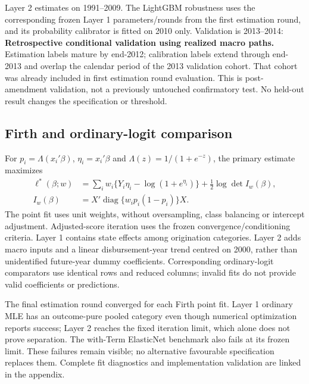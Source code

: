 Layer 2 estimates on 1991--2009. The LightGBM robustness uses the corresponding frozen Layer 1 parameters/rounds from the first estimation round, and its probability calibrator is fitted on 2010 only. Validation is 2013--2014: \textbf{Retrospective conditional validation using realized macro paths.} Estimation labels mature by end-2012; calibration labels extend through end-2013 and overlap the calendar period of the 2013 validation cohort. That cohort was already included in first estimation round evaluation. This is post-amendment validation, not a previously untouched confirmatory test. No held-out result changes the specification or threshold.

\subsection{Firth and ordinary-logit comparison}
For $p_i=\Lambda(x_i'\beta)$, $\eta_i=x_i'\beta$ and $\Lambda(z)=1/(1+e^{-z})$, the primary estimate maximizes
\begin{align*}
\ell^*(\beta;w)&=\sum_iw_i\{Y_i\eta_i-\log(1+e^{\eta_i})\}+\tfrac12\log\det I_w(\beta),\\
I_w(\beta)&=X'\operatorname{diag}\{w_ip_i(1-p_i)\}X.
\end{align*}
The point fit uses unit weights, without oversampling, class balancing or intercept adjustment. Adjusted-score iteration uses the frozen convergence/conditioning criteria. Layer 1 contains state effects among origination categories. Layer 2 adds macro inputs and a linear disbursement-year trend centred on 2000, rather than unidentified future-year dummy coefficients. Corresponding ordinary-logit comparators use identical rows and reduced columns; invalid fits do not provide valid coefficients or predictions.

The final estimation round converged for each Firth point fit. Layer 1 ordinary MLE has an outcome-pure pooled category even though numerical optimization reports success; Layer 2 reaches the fixed iteration limit, which alone does not prove separation. The with-Term ElasticNet benchmark also fails at its frozen limit. These failures remain visible; no alternative favourable specification replaces them. Complete fit diagnostics and implementation validation are linked in the appendix.


